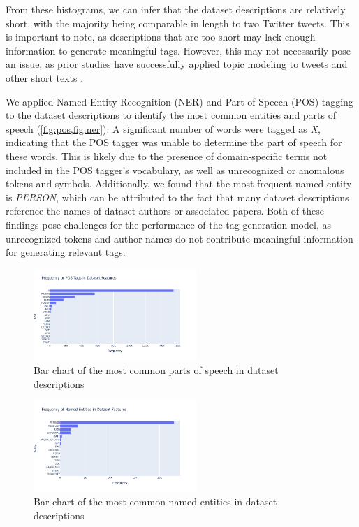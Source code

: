From these histograms, we can infer that the dataset descriptions are relatively short, with the majority being comparable in length to two Twitter tweets. This is important to note, as descriptions that are too short may lack enough information to generate meaningful tags. However, this may not necessarily pose an issue, as prior studies have successfully applied topic modeling to tweets and other short texts \cite{cataldi_emerging_2010, churchill_percolation-based_2020, curiskis_evaluation_2020, kasiviswanathan_emerging_2011, paul_discovering_2014, yin_dirichlet_2014}.

We applied Named Entity Recognition (NER) and Part-of-Speech (POS) tagging to the dataset descriptions to identify the most common entities and parts of speech (\cref{fig:pos,fig:ner}). A significant number of words were tagged as \textit{X}, indicating that the POS tagger was unable to determine the part of speech for these words. This is likely due to the presence of domain-specific terms not included in the POS tagger's vocabulary, as well as unrecognized or anomalous tokens and symbols. Additionally, we found that the most frequent named entity is \textit{PERSON}, which can be attributed to the fact that many dataset descriptions reference the names of dataset authors or associated papers. Both of these findings pose challenges for the performance of the tag generation model, as unrecognized tokens and author names do not contribute meaningful information for generating relevant tags.

\begin{figure}[h]
    \centering
    \includegraphics[width=0.55\textwidth]{figures/pos.png}
    \caption{Bar chart of the most common parts of speech in dataset descriptions}
    \label{fig:pos}
\end{figure}

\begin{figure}[h]
    \centering
    \includegraphics[width=0.55\textwidth]{figures/ner.png}
    \caption{Bar chart of the most common named entities in dataset descriptions}
    \label{fig:ner}
\end{figure}

